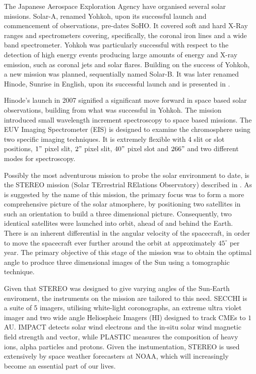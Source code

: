 The Japanese Aerospace Exploration Agency have organised several solar missions.
Solar-A, renamed Yohkoh, \cite{Tsuneta1991} upon its successful launch and commencement of observations, pre-dates SoHO.
It covered soft and hard X-Ray ranges and spectrometers covering, specifically, the coronal iron lines and a wide band spectrometer. 
Yohkoh was particularly successful with respect to the detection of high energy events producing large amounts of energy and X-ray emission, such as coronal jets and solar flares.
Building on the success of Yohkoh, a new mission was planned, sequentially named Solar-B.
It was later renamed Hinode, Sunrise in English, upon its successful launch and is presented in \cite{Kosugi2007}.
 
Hinode's launch in 2007 signified a significant move forward in space based solar observations, building from what was successful in Yohkoh.
The mission introduced small wavelength increment spectroscopy to space based missions.
The EUV Imaging Spectrometer (EIS) is designed to examine the chromosphere using two specific imaging techniques.
It is extremely flexible with 4 slit or slot positions, $1"$ pixel slit, $2"$ pixel slit, $40"$ pixel slot and $266"$ and two different modes for spectroscopy.

Possibly the most adventurous mission to probe the solar environment to date, is the STEREO mission (Solar TErrestrial RElations Observatory) described in \cite{Kaiser2008}.
As is suggested by the name of this mission, the primary focus was to form a more comprehensive picture of the solar atmosphere, by positioning two satellites in such an orientation to build a three dimensional picture.
Consequently, two identical satellites were launched into orbit, ahead of and behind the Earth.
There is an inherent differential in the angular velocity of the spacecraft, in order to move the spacecraft ever further around the orbit at approximately $45^\circ$ per year.
The primary objective of this stage of the mission was to obtain the optimal angle to produce three dimensional images of the Sun using a tomographic technique.

Given that STEREO was designed to give varying angles of the Sun-Earth  enviroment, the instruments on the mission are tailored to this need.
SECCHI is a suite of 5 imagers, utilising white-light coronographs, an extreme ultra violet imager and two wide angle Heliospheic Imagers (HI) designed to track CMEs to $1$ AU.
IMPACT detects solar wind electrons and the in-situ solar wind magnetic field strength and vector, while PLASTIC measures the composition of heavy ions, alpha particles and protons. 
Given the instumentation, STEREO is used extensively by space weather forecasters at NOAA, which will increasingly become an essential part of our lives.

